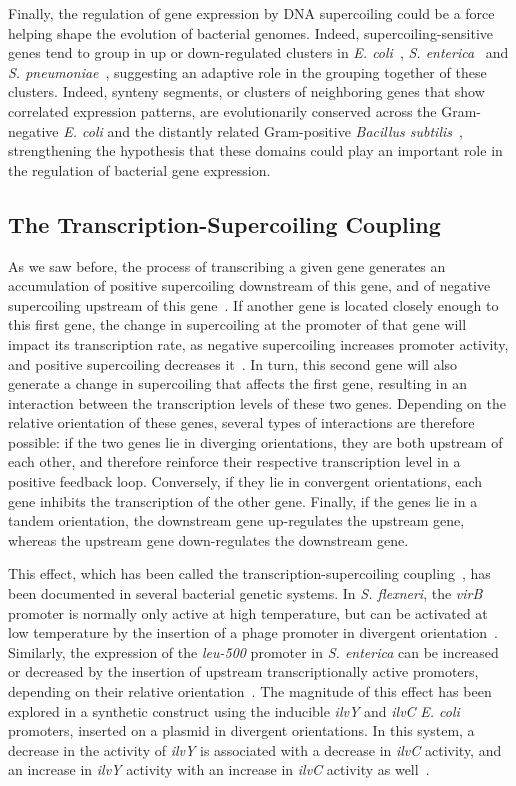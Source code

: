 Finally, the regulation of gene expression by DNA supercoiling could be a force helping shape the evolution of bacterial genomes.
Indeed, supercoiling-sensitive genes tend to group in up or down-regulated clusters in \emph{E. coli}~\citep{peter2004}, \emph{S. enterica}~\citep{webber2013} and \emph{S. pneumoniae}~\citep{ferrandiz2010}, suggesting an adaptive role in the grouping together of these clusters.
Indeed, synteny segments, or clusters of neighboring genes that show correlated expression patterns, are evolutionarily conserved across the Gram-negative \emph{E. coli} and the distantly related Gram-positive \emph{Bacillus subtilis}~\citep{junier2016}, strengthening the hypothesis that these domains could play an important role in the regulation of bacterial gene expression.

\subsection{The Transcription-Supercoiling Coupling}

As we saw before, the process of transcribing a given gene generates an accumulation of positive supercoiling downstream of this gene, and of negative supercoiling upstream of this gene~\citep{liu1987}.
If another gene is located closely enough to this first gene, the change in supercoiling at the promoter of that gene will impact its transcription rate, as negative supercoiling increases promoter activity, and positive supercoiling decreases it~\citep{forquet2021}.
In turn, this second gene will also generate a change in supercoiling that affects the first gene, resulting in an interaction between the transcription levels of these two genes.
Depending on the relative orientation of these genes, several types of interactions are therefore possible: if the two genes lie in diverging orientations, they are both upstream of each other, and therefore reinforce their respective transcription level in a positive feedback loop.
Conversely, if they lie in convergent orientations, each gene inhibits the transcription of the other gene.
Finally, if the genes lie in a tandem orientation, the downstream gene up-regulates the upstream gene, whereas the upstream gene down-regulates the downstream gene.

This effect, which has been called the transcription-supercoiling coupling~\citep{martisb.2019}, has been documented in several bacterial genetic systems.
In \emph{S. flexneri}, the \emph{virB} promoter is normally only active at high temperature, but can be activated at low temperature by the insertion of a phage promoter in divergent orientation~\citep{tobe1995}.
Similarly, the expression of the \emph{leu-500} promoter in \emph{S. enterica} can be increased or decreased by the insertion of upstream transcriptionally active promoters, depending on their relative orientation~\citep{elhanafi2000}.
The magnitude of this effect has been explored in a synthetic construct using the inducible \emph{ilvY} and \emph{ilvC} \emph{E. coli} promoters, inserted on a plasmid in divergent orientations.
In this system, a decrease in the activity of \emph{ilvY} is associated with a decrease in \emph{ilvC} activity, and an increase in \emph{ilvY} activity with an increase in \emph{ilvC} activity as well~\citep{rhee1999}.

